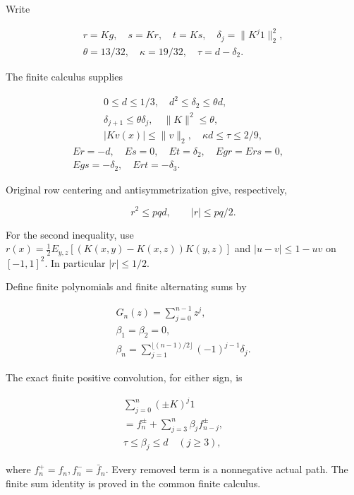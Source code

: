 Write

\[
\begin{gathered}
r=Kg,\quad s=Kr,\quad t=Ks,\quad \delta_j=\|K^j1\|_2^2,\\
\theta=13/32,\quad\kappa=19/32,\quad\tau=d-\delta_2.
\end{gathered}
\]

The finite calculus supplies

\[
\begin{gathered}
0\le d\le1/3,\quad d^2\le \delta_2\le\theta d,\quad\\
\delta_{j+1}\le\theta \delta_j,\quad\|K\|^2\le\theta,\quad\\
|Kv(x)|\le\|v\|_2,\quad \kappa d\le\tau\le2/9,
\end{gathered}\tag{Q87.1.1}\label{eq:Q87:1.1}
\]
\[
\begin{gathered}
Er=-d,\quad Es=0,\quad Et=\delta_2,\quad Egr=Ers=0,\quad\\
Egs=-\delta_2,\quad Ert=-\delta_3.
\end{gathered}\tag{Q87.1.2}\label{eq:Q87:1.2}
\]

Original row centering and antisymmetrization give, respectively,

\[
 r^2\le pqd,\qquad |r|\le pq/2.
 \tag{Q87.1.3}\label{eq:Q87:1.3}
\]

For the second inequality, use
\(r(x)=\allowbreak \frac12E_{y,\allowbreak  z}[(K(x,\allowbreak  y)-K(x,\allowbreak  z))K(y,\allowbreak  z)]\) and
\(|u-v|\le\allowbreak 1-uv\) on \([-1,\allowbreak  1]^2\). In particular \(|r|\le\allowbreak 1/2\).


Define finite polynomials and finite alternating sums by

\[
\begin{gathered}
G_n(z)=\sum_{j=0}^{n-1}z^j,\quad\\
\beta_1=\beta_2=0,\quad\\
\beta_n=\sum_{j=1}^{\lfloor(n-1)/2\rfloor}(-1)^{j-1}\delta_j.
\end{gathered}
\]

The exact finite positive convolution, for either sign, is

\[
\begin{gathered}
\sum_{j=0}^n(\pm K)^j1\\
=f_n^\pm+\sum_{j=3}^n\beta_jf_{n-j}^\pm,\qquad\\
\tau\le\beta_j\le d\quad(j\ge3),
\end{gathered}\tag{Q87.1.4}\label{eq:Q87:1.4}
\]

where \(f_n^+=\allowbreak f_n,\allowbreak  f_n^-=\allowbreak \bar f_n\). Every removed term is a nonnegative
actual path. The finite sum identity is proved in the common finite calculus.

